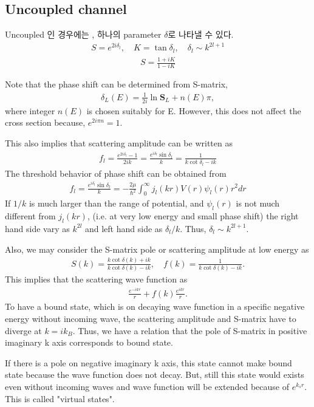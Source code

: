 \documentclass[10pt]{book}
\def\bm{\boldsymbol}
\newcommand{\bea}{\begin{eqnarray}}
\newcommand{\eea}{\end{eqnarray}}
\begin{document}
\subsection{Uncoupled channel}
Uncoupled 인 경우에는 , 하나의 parameter $\delta$로 나타낼 수 있다.
\bea
S=e^{2i\delta_l}, \quad K=\tan\delta_l,\quad \delta_l\sim k^{2l+1}
\eea 
\bea
S=\frac{1+i K}{1-i K}
\eea

Note that the phase shift can be determined from S-matrix,
\bea
\delta_L(E)=\frac{1}{2i}\ln {\bm S}_L +n(E)\pi,
\eea
where integer $n(E)$ is chosen suitably for E.
However, this does not affect the cross section because,
$e^{2i\pi n}=1$. 

This also implies that scattering amplitude can be written as
\bea
f_l=\frac{e^{2i\delta_l}-1}{2ik}=\frac{e^{i\delta_l}\sin\delta_l}{k}=
   \frac{1}{k\cot\delta_l-ik }
\eea 
The threshold behavior of phase shift can be obtained from
\bea
f_l=\frac{e^{i\delta_l}\sin\delta_l}{k}
=-\frac{2\mu}{\hbar^2}\int_0^\infty j_l(kr) V(r) \psi_l(r) r^2 dr
\eea 
If $1/k$ is much larger than the range of potential,
and $\psi_l(r)$ is not much different from $j_l(kr)$, 
(i.e. at very low energy and small phase shift)
the right hand side vary as $k^{2l}$ and left hand side as $\delta_l/k$.
Thus, $\delta_l\sim k^{2l+1}$.

Also, we may consider the S-matrix pole or scattering amplitude at low energy as
\bea 
S(k)=\frac{k\cot\delta(k)+i k}{k\cot\delta(k)- i k},
\quad f(k)=\frac{1}{k\cot\delta(k)-ik}.
\eea 
This implies that the scattering wave function as
\bea 
\frac{e^{-ikr}}{r}+f(k)\frac{e^{ikr}}{r}.
\eea 
To have a bound state, which is on decaying wave function in a specific 
negative energy without incoming wave, the scattering amplitude 
and S-matrix have to diverge at $k=i k_B$. Thus, 
we have a relation that the pole of S-matrix in positive
imaginary k axis corresponds to bound state. 

If there is a pole on negative imaginary k axis,
this state cannot make bound state because the wave function does not decay.
But, still this state would exists even without incoming waves and wave
function will be extended because of $e^{k_s r}$. This is called "virtual states".
 
  
 
\end{document}
